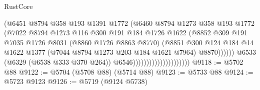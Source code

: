 \begin{lexlean}{RustCore}
\begin{coremodule}
{\begin{coremodule}
{{{{{{{{{{{{{{{{{{{{{{{{{{{{{{{{{{{{{{{{{{{{                                                (@6451
                                                  @8794
                                                  @358
                                                  @193
                                                  @1391
                                                  @1772
                                                  (@6460
                                                    @8794
                                                    @1273
                                                    @358
                                                    @193
                                                    @1772
                                                    (@7022
                                                      @8794
                                                      @1273
                                                      @116
                                                      @300
                                                      @191
                                                      @184
                                                      @1726
                                                      @1622
                                                      (@8852
                                                        @309
                                                        @191
                                                        @7035
                                                        @1726
                                                        @8031
                                                        (@8860 @1726 @8863 @8770)
                                                        (@8851
                                                          @300
                                                          @124
                                                          @184
                                                          @14
                                                          @1622
                                                          @1377
                                                          (@7044 @8794 @1273 @203 @184 @1621 @7964)
                                                          @8870))))))
                                              @6533
                                              (@6329 (@6538 @333 @370 @264))
                                              @6546)))))))))))))))))))))
@9118 := @5702 @88
@9122 := @5704 (@5708 @88) (@5714 @88)
@9123 := @5733 @88
@9124 := @5723 @9123
@9126 := @5719 (@9124 @5738)
}}}}}}}}}}}}}}}}}}}}}}}}}}}}}}}}}}}}}}}}}}}}
\end{coremodule}}
\end{coremodule}
\end{lexlean}
